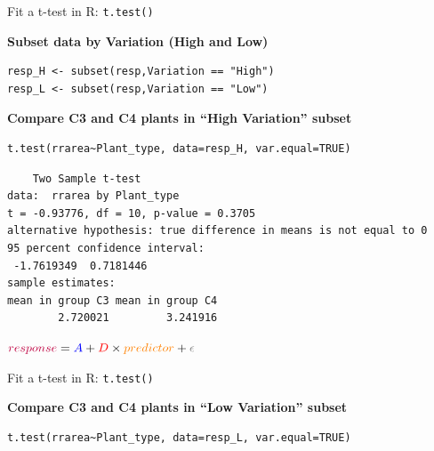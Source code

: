 \documentclass[10pt]{beamer}
\makeatletter
\newenvironment{kframe}{%
 \def\at@end@of@kframe{}%
 \ifinner\ifhmode%
  \def\at@end@of@kframe{\end{minipage}}%
  \begin{minipage}{\columnwidth}%
 \fi\fi%
 \def\FrameCommand##1{\hskip\@totalleftmargin \hskip-\fboxsep
 \colorbox{shadecolor}{##1}\hskip-\fboxsep
     \hskip-\linewidth \hskip-\@totalleftmargin \hskip\columnwidth}%
 \MakeFramed {\advance\hsize-\width
   \@totalleftmargin\z@ \linewidth\hsize
   \@setminipage}}%
 {\par\unskip\endMakeFramed%
 \at@end@of@kframe}
\newenvironment{knitrout}{}{} %
\makeatother
\begin{document}
\begin{frame}[fragile]{Fit a t-test in R: \texttt{t.test()}}

\textbf{Subset data by Variation (High and Low)}

\begin{knitrout}
\color{fgcolor}\begin{kframe}
\begin{verbatim}
resp_H <- subset(resp,Variation == "High")
resp_L <- subset(resp,Variation == "Low")
\end{verbatim}
\end{kframe}
\end{knitrout}

\pause

\textbf{Compare C3 and C4 plants in “High Variation” subset}
\begin{knitrout}
\color{fgcolor}\begin{kframe}
\begin{verbatim}
t.test(rrarea~Plant_type, data=resp_H, var.equal=TRUE)
\end{verbatim}
\end{kframe}
\end{knitrout}

\pause
\begin{knitrout}
\color{fgcolor}\begin{kframe}
\small
\begin{verbatim}
	Two Sample t-test
data:  rrarea by Plant_type
t = -0.93776, df = 10, p-value = 0.3705
alternative hypothesis: true difference in means is not equal to 0
95 percent confidence interval:
 -1.7619349  0.7181446
sample estimates:
mean in group C3 mean in group C4 
        2.720021         3.241916 
\end{verbatim}
\end{kframe}
\end{knitrout}

\pause
${\color{purple}{response}} = {\color{blue}{A}} + {\color{red}{D}} \times {\color{orange}{predictor}} + {\color{gray}{\epsilon}}$

\end{frame}

\begin{frame}[fragile]{Fit a t-test in R: \texttt{t.test()}}

\textbf{Compare C3 and C4 plants in “Low Variation” subset}
\begin{knitrout}
\color{fgcolor}\begin{kframe}
\begin{verbatim}
t.test(rrarea~Plant_type, data=resp_L, var.equal=TRUE)
\end{verbatim}
\end{kframe}
\end{knitrout}

\end{frame}
\end{document}
